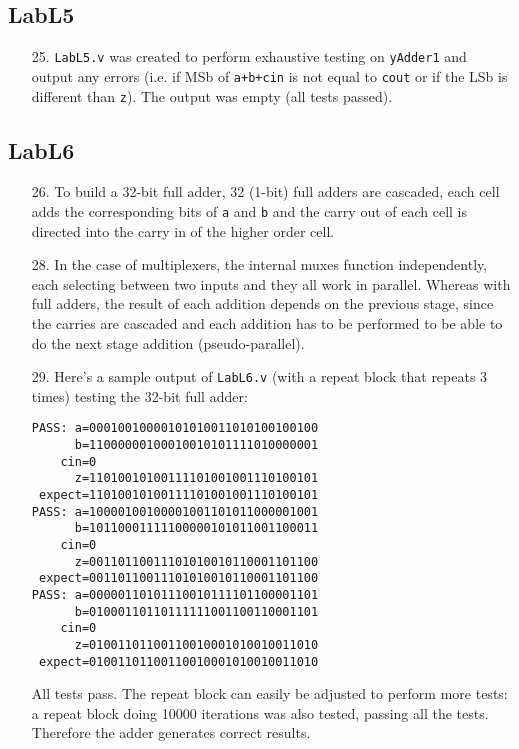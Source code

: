 \documentclass{article}
\begin{document}
\subsection{LabL5}
\begin{enumerate}
\item[25. ] \verb$LabL5.v$ was created to perform exhaustive testing
on \verb$yAdder1$ and output any errors (i.e. if MSb of \verb$a+b+cin$
is not equal to \verb$cout$ or if the LSb is different than \verb$z$).
The output was empty (all tests passed).
\end{enumerate}

\subsection{LabL6}
\begin{enumerate}
\item[26. ] To build a 32-bit full adder, 32 (1-bit) full adders are cascaded,
each cell adds the corresponding bits of \verb$a$ and \verb$b$ and the
carry out of each cell is directed into the carry in of the higher order cell.

\item[28. ] In the case of multiplexers, the internal muxes function
independently, each selecting between two inputs and they all work in parallel.
Whereas with full adders, the result of each addition depends on the previous
stage, since the carries are cascaded and each addition has to be performed to
be able to do the next stage addition (pseudo-parallel).

\item[29. ] Here's a sample output of \verb$LabL6.v$ (with a repeat block that
repeats 3 times) testing the 32-bit full adder:
\begin{verbatim}
PASS: a=00010010000101010011010100100100
      b=11000000100010010101111010000001
    cin=0
      z=11010010100111101001001110100101
 expect=11010010100111101001001110100101
PASS: a=10000100100001001101011000001001
      b=10110001111100000101011001100011
    cin=0
      z=00110110011101010010110001101100
 expect=00110110011101010010110001101100
PASS: a=00000110101110010111101100001101
      b=01000110110111111001100110001101
    cin=0
      z=01001101100110010001010010011010
 expect=01001101100110010001010010011010
\end{verbatim}
  All tests pass. The repeat block can easily be adjusted to perform more tests:
a repeat block doing 10000 iterations was also tested, passing all the tests.
Therefore the adder generates correct results.
\end{enumerate}
\end{document}
